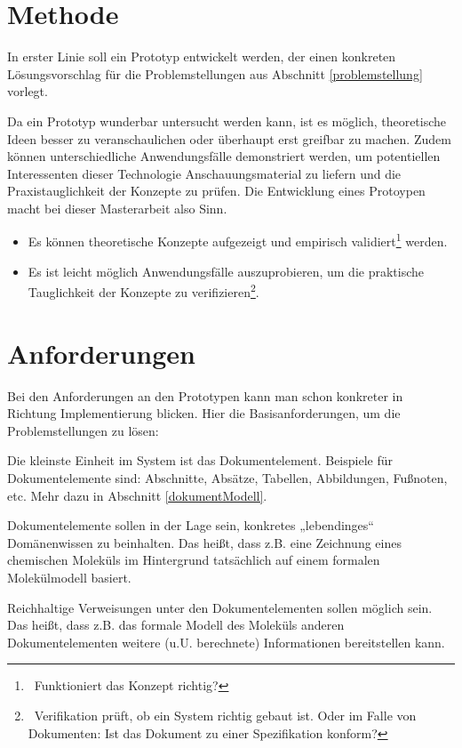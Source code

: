  
\section{Methode}\label{}
 
In erster Linie soll ein Prototyp entwickelt werden, der einen konkreten Lösungsvorschlag für die Problemstellungen aus Abschnitt \ref{problemstellung} vorlegt.

 
Da ein Prototyp wunderbar untersucht werden kann, ist es möglich, theoretische Ideen besser zu veranschaulichen oder überhaupt erst greifbar zu machen. Zudem können unterschiedliche Anwendungsfälle demonstriert werden, um potentiellen Interessenten dieser Technologie Anschauungsmaterial zu liefern und die Praxistauglichkeit der Konzepte zu prüfen. Die Entwicklung eines Protoypen macht bei dieser Masterarbeit also Sinn.

 
\begin{itemize}

\item Es können theoretische Konzepte aufgezeigt und empirisch validiert\footnote{~Funktioniert das Konzept richtig?} werden.
\item Es ist leicht möglich Anwendungsfälle auszuprobieren, um die praktische Tauglichkeit der Konzepte zu verifizieren\footnote{~Verifikation prüft, ob ein System richtig gebaut ist. Oder im Falle von Dokumenten: Ist das Dokument zu einer Spezifikation konform?}.
\end{itemize}
 
\section{Anforderungen}\label{anforderungen-sec}
 
Bei den Anforderungen an den Prototypen kann man schon konkreter in Richtung Implementierung blicken. Hier die Basisanforderungen, um die Problemstellungen zu lösen:

 
Die kleinste Einheit im System ist das Dokumentelement. Beispiele für Dokumentelemente sind: Abschnitte, Absätze, Tabellen, Abbildungen, Fußnoten, etc. Mehr dazu in Abschnitt \ref{dokumentModell}.

 
Dokumentelemente sollen in der Lage sein, konkretes „lebendinges“ Domänenwissen zu beinhalten. Das heißt, dass z.B. eine Zeichnung eines chemischen Moleküls im Hintergrund tatsächlich auf einem formalen Molekülmodell basiert.

 
Reichhaltige Verweisungen unter den Dokumentelementen sollen möglich sein. Das heißt, dass z.B. das formale Modell des Moleküls anderen Dokumentelementen weitere (u.U. berechnete) Informationen bereitstellen kann.

